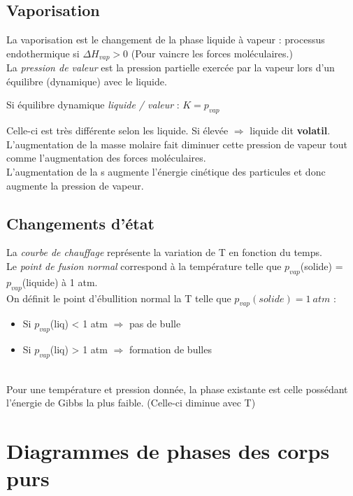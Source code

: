 \documentclass	[11pt, a4paper, openany]{book}
\begin{document}
\subsection{Vaporisation}
La vaporisation est le changement de la phase liquide à vapeur : processus endothermique si $\Delta H_{vap} > 0$ (Pour vaincre les forces moléculaires.)\\
La \textit{pression de valeur} est la pression partielle exercée par la vapeur lors d'un équilibre (dynamique) avec le liquide.
\begin{center}
	Si équilibre dynamique \textit{liquide / valeur} : $K = p_{vap}$
\end{center}
Celle-ci est très différente selon les liquide. Si élevée $\Rightarrow$ liquide dit \textbf{volatil}.\\
L'augmentation de la masse molaire fait diminuer cette pression de vapeur tout comme l'augmentation des forces moléculaires.\\
L'augmentation de la s augmente l'énergie cinétique des particules et donc augmente la pression de vapeur.

\subsection{Changements d'état}
La \textit{courbe de chauffage} représente la variation de T en fonction du temps.\\
Le \textit{point de fusion normal} correspond à la température telle que $p_{vap}$(solide) = $p_{vap}$(liquide) à 1 atm.\\
On définit le point d'ébullition normal la T telle que $p_{vap}(solide) = 1\ atm$ :
\begin{itemize}
	\item Si $p_{vap}$(liq) < 1 atm $\Rightarrow$ pas de bulle
	\item Si $p_{vap}$(liq) > 1 atm $\Rightarrow$ formation de bulles
\end{itemize}
\ \\
Pour une température et pression donnée, la phase existante est celle possédant l'énergie de Gibbs la plus faible. (Celle-ci diminue avec T)

\section{Diagrammes de phases des corps purs}
\end{document}
